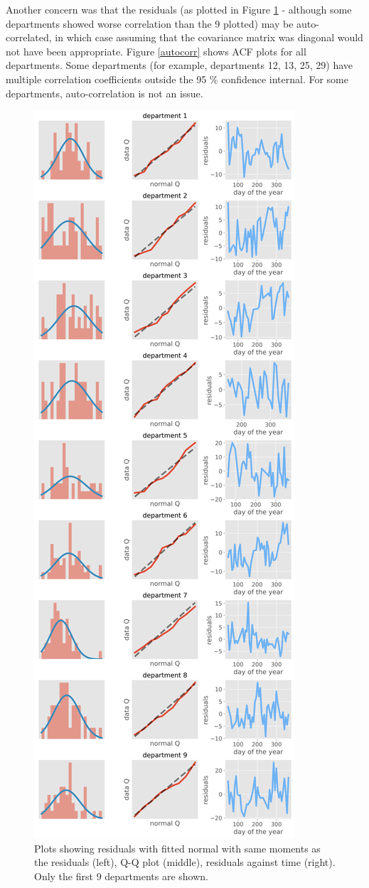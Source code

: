 \documentclass[paper=a4, fontsize=11pt]{scrartcl}
\begin{document}
Another concern was that the residuals (as plotted in Figure \ref{normal} - although some departments showed worse correlation than the 9 plotted) may be auto-correlated, in which case assuming that the covariance matrix was diagonal would not have been appropriate. Figure \ref{autocorr} shows ACF plots for all departments. Some departments (for example, departments 12, 13, 25, 29) have multiple correlation coefficients outside the 95 \% confidence internal. For some departments, auto-correlation is not an issue.
    
    
\begin{figure}[h]\label{normal}
\centering
\includegraphics[width=.5\textwidth]{normal_approx_1.png}
\caption{Plots showing residuals with fitted normal with same moments as the residuals (left), Q-Q plot (middle), residuals against time (right). Only the first 9 departments are shown.}
\end{figure}
\end{document}
